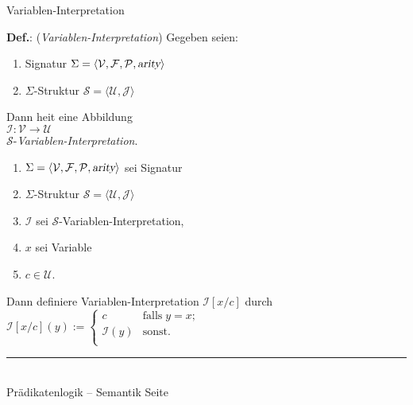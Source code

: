 \documentclass{slides}
\newcommand{\myrule}{\rule{20cm}{1mm}\\ }
\newcommand{\struct}{\mathcal{S}}
\newcounter{mypage}
\begin{document}
\begin{slide}{}
\normalsize
\begin{center}
Variablen-Interpretation
\end{center}
\vspace{0.5cm}

\footnotesize
\textbf{Def.}: (\emph{Variablen-Interpretation}) \quad Gegeben seien:
\begin{enumerate}
\item Signatur \quad
      $\Sigma = \langle \mathcal{V}, \mathcal{F}, \mathcal{P}, \textsl{arity} \rangle$ 
\item $\Sigma$-Struktur \quad $\struct = \langle \mathcal{U}, \mathcal{J} \rangle$ 
\end{enumerate}
Dann hei\3t eine Abbildung \\[0.3cm]
\hspace*{1.3cm} $\mathcal{I}: \mathcal{V} \rightarrow \mathcal{U}$ \\[0.3cm]
$\struct$-\emph{Variablen-Interpretation}.

\begin{enumerate}
\item $\Sigma = \langle \mathcal{V}, \mathcal{F}, \mathcal{P}, \textsl{arity} \rangle$ 
      sei Signatur
\item $\Sigma$-Struktur $\struct = \langle \mathcal{U}, \mathcal{J} \rangle$ 
\item $\mathcal{I}$ sei $\struct$-Variablen-Interpretation,

\item $x$ sei Variable 
\item $c \in \mathcal{U}$.
\end{enumerate}
Dann definiere Variablen-Interpretation $\mathcal{I}[x/c]$ durch \\[0.1cm]
\hspace*{1.3cm} 
    $\mathcal{I}[x/c](y) := \left\{
    \begin{array}{ll}
    c               & \mbox{falls}\; y = x;  \\
    \mathcal{I}(y)  & \mbox{sonst}.          \\
    \end{array}
    \right.$ 

\vspace*{\fill}
\tiny \addtocounter{mypage}{1}
\myrule
Pr\"{a}dikatenlogik -- Semantik  \hspace*{\fill} Seite 
\end{slide}

\end{document}
